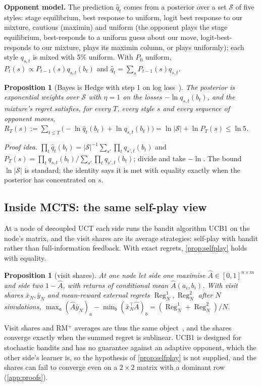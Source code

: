 \documentclass[10pt]{article}
\theoremstyle{plain}
\newtheorem{proposition}[theorem]{Proposition}
\theoremstyle{definition}
\theoremstyle{remark}
\newcommand{\Ahat}{\hat A}
\DeclareMathOperator{\Reg}{Reg}
\begin{document}
\textbf{Opponent model.} The prediction $\hat q_t$ comes from a posterior over a set $\mathcal S$ of five styles: stage equilibrium, best response to uniform, logit best response to our mixture, cautious (maximin) and uniform (the opponent plays the stage equilibrium, best-responds to a uniform guess about our move, logit-best-responds to our mixture, plays its maximin column, or plays uniformly); each style $q_{s,t}$ is mixed with 5\% uniform. With $P_0$ uniform, $P_t(s)\propto P_{t-1}(s)q_{s,t}(b_t)$ and $\hat q_t=\sum_sP_{t-1}(s)q_{s,t}$.
\begin{proposition}[Bayes is Hedge with step 1 on log loss~\cite{CBL06,Rei14}]\label{prop:bayes}
The posterior is exponential weights over $\mathcal S$ with $\eta=1$ on the losses $-\ln q_{s,t}(b_t)$, and the mixture's regret satisfies, for every $T$, every style $s$ and every sequence of opponent moves, $R_T(s):=\sum_{t\le T}\big(-\ln\hat q_t(b_t)+\ln q_{s,t}(b_t)\big)=\ln|\mathcal S|+\ln P_T(s)\le\ln5$.
\end{proposition}
\emph{Proof idea.} $\prod_t\hat q_t(b_t)=|\mathcal S|^{-1}\sum_{s'}\prod_tq_{s',t}(b_t)$ and $P_T(s)=\prod_tq_{s,t}(b_t)/\sum_{s'}\prod_tq_{s',t}(b_t)$; divide and take $-\ln$. The bound $\ln|\mathcal S|$ is standard; the identity says it is met with equality exactly when the posterior has concentrated on $s$.

\subsection{Inside MCTS: the same self-play view}
\label{sec:mcts}
At a node of decoupled UCT each side runs the bandit algorithm UCB1 on the node's matrix, and the visit shares are its average strategies: self-play with bandit rather than full-information feedback. With exact regrets, \cref{prop:selfplay} holds with equality.
\begin{proposition}[visit shares]\label{prop:visits}
At one node let side one maximise $\Ahat\in[0,1]^{n\times m}$ and side two $1-\Ahat$, with returns of conditional mean $\Ahat(a_i,b_i)$. With visit shares $\bar x_N,\bar y_N$ and mean-reward external regrets $\Reg^1_N,\Reg^2_N$ after $N$ simulations, $\max_a(\Ahat\bar y_N)_a-\min_b(\bar x_N^\top\Ahat)_b=(\Reg^1_N+\Reg^2_N)/N$.
\end{proposition}
Visit shares and RM$^+$ averages are thus the same object~\cite{Lis13}, and the shares converge exactly when the summed regret is sublinear. UCB1 is designed for stochastic bandits and has no guarantee against an adaptive opponent, which the other side's learner is, so the hypothesis of \cref{prop:selfplay} is not supplied, and the shares can fail to converge even on a $2\times2$ matrix with a dominant row (\cref{app:proofs}).
\end{document}
